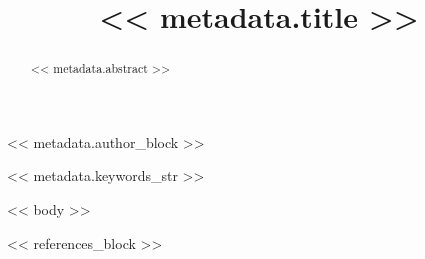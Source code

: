 \documentclass[conference]{IEEEtran}
\begin{document}
\title{<< metadata.title >>}

<< metadata.author_block >>

\maketitle

\begin{abstract}
<< metadata.abstract >>
\end{abstract}

\begin{IEEEkeywords}
<< metadata.keywords_str >>
\end{IEEEkeywords}

<< body >>

<< references_block >>
\end{document}
